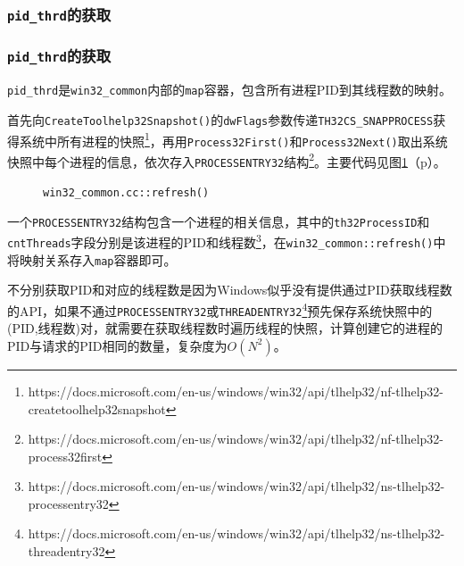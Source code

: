 \documentclass{beamer}
\newcommand\code[1]{\texttt{#1}}
\newcommand\myref[1]{\ref{#1}（p\pageref{#1}）}
\begin{document}
\subsubsection{\code{pid\_thrd}的获取}
\begin{frame}
    \frametitle{\code{pid\_thrd}的获取}
    \code{pid\_thrd}是\code{win32\_common}内部的\code{map}容器，包含所有进程PID到其线程数的映射。

首先向\code{CreateToolhelp32Snapshot()}的\code{dwFlags}参数传递\code{TH32CS\_SNAPPROCESS}获得系统中所有进程的快照\footnote{https://docs.microsoft.com/en-us/windows/win32/api/tlhelp32/nf-tlhelp32-createtoolhelp32snapshot}，再用\code{Process32First()}和\code{Process32Next()}取出系统快照中每个进程的信息，依次存入\code{PROCESSENTRY32}结构\footnote{https://docs.microsoft.com/en-us/windows/win32/api/tlhelp32/nf-tlhelp32-process32first}。主要代码见图\myref{code:pidthrd}。
\end{frame}

\begin{frame}
\begin{figure}[H]
    \ttfamily
    
    \caption{\code{win32\_common.cc::refresh()}}
    \label{code:pidthrd}
\end{figure}
\end{frame}

\begin{frame}
一个\code{PROCESSENTRY32}结构包含一个进程的相关信息，其中的\code{th32ProcessID}和\code{cntThreads}字段分别是该进程的PID和线程数\footnote{https://docs.microsoft.com/en-us/windows/win32/api/tlhelp32/ns-tlhelp32-processentry32}，在\code{win32\_common::refresh()}中将映射关系存入\code{map}容器即可。
\end{frame}

\begin{frame}
不分别获取PID和对应的线程数是因为Windows似乎没有提供通过PID获取线程数的API，如果不通过\code{PROCESSENTRY32}或\code{THREADENTRY32}\footnote{https://docs.microsoft.com/en-us/windows/win32/api/tlhelp32/ns-tlhelp32-threadentry32}预先保存系统快照中的(PID,线程数)对，就需要在获取线程数时遍历线程的快照，计算创建它的进程的PID与请求的PID相同的数量，复杂度为$O(N^2)$。
\end{frame}
\end{document}
